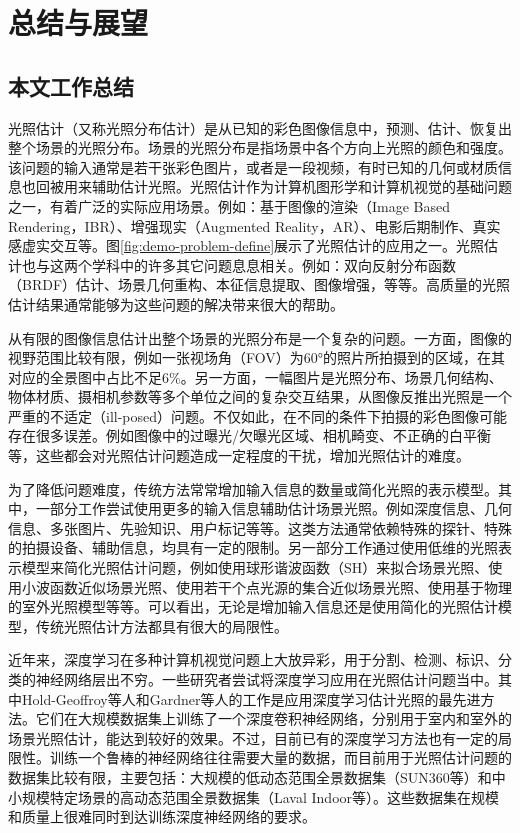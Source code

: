 \chapter{总结与展望}
\section{本文工作总结}
光照估计（又称光照分布估计）是从已知的彩色图像信息中，预测、估计、恢复出整个场景的光照分布。场景的光照分布是指场景中各个方向上光照的颜色和强度。该问题的输入通常是若干张彩色图片，或者是一段视频，有时已知的几何或材质信息也回被用来辅助估计光照。光照估计作为计算机图形学和计算机视觉的基础问题之一，有着广泛的实际应用场景。例如：基于图像的渲染（Image Based Rendering，IBR）、增强现实（Augmented Reality，AR）、电影后期制作、真实感虚实交互等。图\ref{fig:demo-problem-define}展示了光照估计的应用之一。光照估计也与这两个学科中的许多其它问题息息相关。例如：双向反射分布函数（BRDF）估计、场景几何重构、本征信息提取、图像增强，等等。高质量的光照估计结果通常能够为这些问题的解决带来很大的帮助。

从有限的图像信息估计出整个场景的光照分布是一个复杂的问题。一方面，图像的视野范围比较有限，例如一张视场角（FOV）为60°的照片所拍摄到的区域，在其对应的全景图中占比不足6\%。另一方面，一幅图片是光照分布、场景几何结构、物体材质、摄相机参数等多个单位之间的复杂交互结果，从图像反推出光照是一个严重的不适定（ill-posed）问题。不仅如此，在不同的条件下拍摄的彩色图像可能存在很多误差。例如图像中的过曝光/欠曝光区域、相机畸变、不正确的白平衡等，这些都会对光照估计问题造成一定程度的干扰，增加光照估计的难度。

为了降低问题难度，传统方法常常增加输入信息的数量或简化光照的表示模型。其中，一部分工作尝试使用更多的输入信息辅助估计场景光照。例如深度信息、几何信息、多张图片、先验知识、用户标记等等。这类方法通常依赖特殊的探针、特殊的拍摄设备、辅助信息，均具有一定的限制。另一部分工作通过使用低维的光照表示模型来简化光照估计问题，例如使用球形谐波函数（SH）来拟合场景光照、使用小波函数近似场景光照、使用若干个点光源的集合近似场景光照、使用基于物理的室外光照模型等等。可以看出，无论是增加输入信息还是使用简化的光照估计模型，传统光照估计方法都具有很大的局限性。

近年来，深度学习在多种计算机视觉问题上大放异彩，用于分割、检测、标识、分类的神经网络层出不穷。一些研究者尝试将深度学习应用在光照估计问题当中。其中Hold-Geoffroy等人\cite{hold2017deep}和Gardner\cite{gardner2017learning}等人的工作是应用深度学习估计光照的最先进方法。它们在大规模数据集上训练了一个深度卷积神经网络，分别用于室内和室外的场景光照估计，能达到较好的效果。不过，目前已有的深度学习方法也有一定的局限性。训练一个鲁棒的神经网络往往需要大量的数据，而目前用于光照估计问题的数据集比较有限，主要包括：大规模的低动态范围全景数据集（SUN360\cite{xiao2012recognizing}等）和中小规模特定场景的高动态范围全景数据集（Laval Indoor等\cite{gardner2017learning}）。这些数据集在规模和质量上很难同时到达训练深度神经网络的要求。

